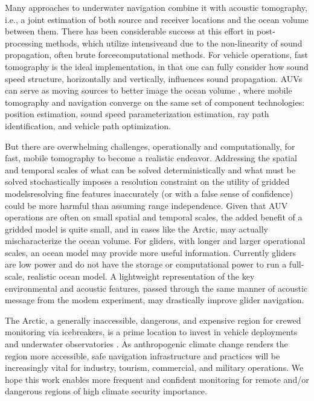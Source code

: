 Many approaches to underwater navigation combine it with acoustic tomography, i.e., a joint estimation of both source and receiver locations and the ocean volume between them.
There has been considerable success at this effort in post-processing methods, which utilize intensive\textemdash and due to the non-linearity of sound propagation, often brute force\textemdash computational methods. 
For vehicle operations, fast tomography is the ideal implementation, in that one can fully consider how sound speed structure, horizontally and vertically, influences sound propagation.
AUVs can serve as moving sources to better image the ocean volume \citep{deffenbaugh_optimal_1997,elisseeff_ocean_2002}, where mobile tomography and navigation converge on the same set of component technologies: position estimation, sound speed parameterization estimation, ray path identification, and vehicle path optimization.

But there are overwhelming challenges, operationally and computationally, for fast, mobile tomography to become a realistic endeavor.
Addressing the spatial and temporal scales of what can be solved deterministically and what must be solved stochastically imposes a resolution constraint on the utility of gridded models\textemdash resolving fine features inaccurately (or with a false sense of confidence) could be more harmful than assuming range independence.
Given that AUV operations are often on small spatial and temporal scales, the added benefit of a gridded model is quite small, and in cases like the Arctic, may actually mischaracterize the ocean volume. 
For gliders, with longer and larger operational scales, an ocean model may provide more useful information.
Currently gliders are low power and do not have the storage or computational power to run a full-scale, realistic ocean model.
A lightweight representation of the key environmental and acoustic features, passed through the same manner of acoustic message from the modem experiment, may drastically improve glider navigation.

The Arctic, a generally inaccessible, dangerous, and expensive region for crewed monitoring via icebreakers,  is a prime location to invest in vehicle deployments and underwater observatories \citep{mikhalevsky_multipurpose_2015}.
As anthropogenic climate change renders the region more accessible, safe navigation infrastructure and practices will be increasingly vital for industry, tourism, commercial, and military operations.
We hope this work enables more frequent and confident monitoring for remote and/or dangerous regions of high climate security importance.

